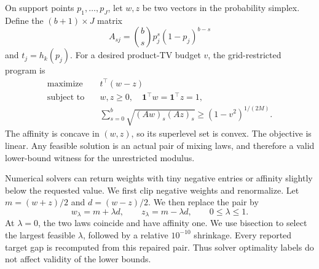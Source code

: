 \documentclass[twoside]{article}
\begin{document}
On support points \(p_1,\ldots,p_J\), let \(w,z\) be two vectors in the
probability simplex. Define the \((b+1)\times J\) matrix
\[
 A_{sj}=\binom bs p_j^s(1-p_j)^{b-s}
\]
and \(t_j=h_k(p_j)\). For a desired product-TV budget \(v\), the
grid-restricted program is
\begin{align*}
\text{maximize}\quad &t^\top(w-z)\\
\text{subject to}\quad
&w,z\geq0,\quad\mathbf1^\top w=\mathbf1^\top z=1,\\
&\sum_{s=0}^b\sqrt{(Aw)_s(Az)_s}
\geq(1-v^2)^{1/(2M)}.
\end{align*}
The affinity is concave in \((w,z)\), so its superlevel set is convex. The
objective is linear. Any feasible solution is an actual pair of mixing laws,
and therefore a valid lower-bound witness for the unrestricted modulus.

Numerical solvers can return weights with tiny negative entries or affinity
slightly below the requested value. We first clip negative weights and
renormalize. Let \(m=(w+z)/2\) and \(d=(w-z)/2\). We then replace the pair by
\[
 w_\lambda=m+\lambda d,\qquad z_\lambda=m-\lambda d,
 \qquad0\leq\lambda\leq1.
\]
At \(\lambda=0\), the two laws coincide and have affinity one. We use
bisection to select the largest feasible \(\lambda\), followed by a relative
\(10^{-10}\) shrinkage. Every reported target gap is recomputed from this
repaired pair. Thus solver optimality labels do not affect validity of the
lower bounds.
\end{document}
